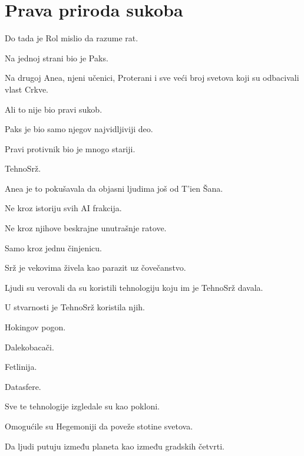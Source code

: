 
\chapter{Prava priroda sukoba}


Do tada je Rol mislio da razume rat.

\bigskip

Na jednoj strani bio je Paks.

Na drugoj Anea, njeni učenici, Proterani i sve veći broj svetova koji su odbacivali vlast Crkve.

\bigskip

Ali to nije bio pravi sukob.

\bigskip

Paks je bio samo njegov najvidljiviji deo.

\bigskip

Pravi protivnik bio je mnogo stariji.

TehnoSrž.

\bigskip

Anea je to pokušavala da objasni ljudima još od T'ien Šana.

Ne kroz istoriju svih AI frakcija.

Ne kroz njihove beskrajne unutrašnje ratove.

\bigskip

Samo kroz jednu činjenicu.

\bigskip

Srž je vekovima živela kao parazit uz čovečanstvo.

\bigskip

Ljudi su verovali da su koristili tehnologiju koju im je TehnoSrž davala.

U stvarnosti je TehnoSrž koristila njih.

\bigskip

Hokingov pogon.

Dalekobacači.

Fetlinija.

Datasfere.

\bigskip

Sve te tehnologije izgledale su kao pokloni.

Omogućile su Hegemoniji da poveže stotine svetova.

Da ljudi putuju između planeta kao između gradskih četvrti.

